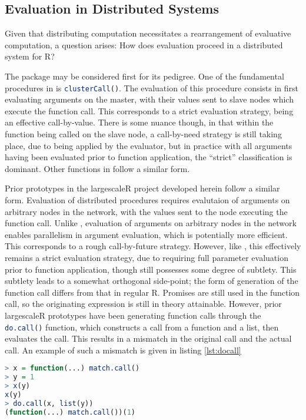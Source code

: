 \subsection{Evaluation in \R Distributed Systems}\label{sec:rdisteval}

Given that distributing computation necessitates a rearrangement of evaluative computation, a question arises: How does evaluation proceed in a distributed system for R?

The  package may be considered first for its pedigree.
One of the fundamental procedures in  is \lstinline[language=R]{clusterCall()}\cite{tierney2018snow}.
The evaluation of this procedure consists in first evaluating arguments on the master, with their values sent to slave nodes which execute the function call.
This corresponds to a strict evaluation strategy, being an effective call-by-value.
There is some nuance though, in that within the function being called on the slave node, a call-by-need strategy is still taking place, due to being applied by the \R evaluator, but in practice with all arguments having been evaluated prior to function application, the ``strict'' classification is dominant.
Other functions in  follow a similar form.

Prior prototypes in the largescaleR project developed herein follow a similar form.
Evaluation of distributed procedures requires evalutaion of arguments on arbitrary nodes in the network, with the values sent to the node executing the function call.
Unlike , evaluation of arguments on arbitrary nodes in the network enables parallelism in argument evaluation, which is potentially more efficient.
This corresponds to a rough call-by-future strategy.
However, like , this effectively remains a strict evaluation strategy, due to requiring full parameter evaluation prior to function application, though still possesses some degree of subtlety.
This subtlety leads to a somewhat orthogonal side-point; the form of generation of the function call differs from that in regular R.
Promises are still used in the function call, so the originating expression is still in theory attainable.
However, prior largescaleR prototypes have been generating function calls through the \lstinline[language=R]{do.call()} function, which constructs a call from a function and a list, then evaluates the call.
This results in a mismatch in the original call and the actual call.
An example of such a mismatch is given in listing \cref{lst:docall}

\begin{lstlisting}[language=R,float,caption={A mismatch in an actual call and one generated with do.call},label=lst:docall]
> x = function(...) match.call()
> y = 1
> x(y)
x(y)
> do.call(x, list(y))
(function(...) match.call())(1)
\end{lstlisting}

